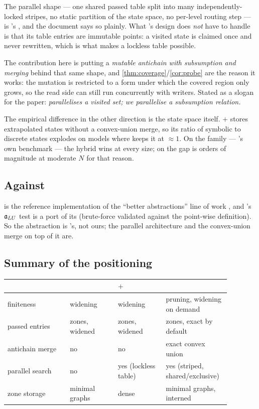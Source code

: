 The parallel shape --- one shared passed table split into many
independently-locked stripes, no static partition of the state space, no
per-level routing step --- is \ltsmin{}'s
\cite{LTSmin,OpaalLTSmin}, and the document says so plainly.  What
\ltsmin{}'s design does \emph{not} have to handle is that its table entries are
immutable points: a visited state is claimed once and never rewritten, which is
what makes a lockless table possible.

The contribution here is putting a \emph{mutable antichain with subsumption and
merging} behind that same shape, and \cref{thm:coverage}/\cref{cor:probe} are
the reason it works: the mutation is restricted to a form under which the
covered region only grows, so the read side can still run concurrently with
writers.  Stated as a slogan for the paper: \emph{\ltsmin{} parallelises a
visited set; we parallelise a subsumption relation.}

The empirical difference in the other direction is the state space itself.
\opaal{}$+$\ltsmin{} stores extrapolated states without a convex-union merge, so
its ratio of symbolic to discrete states explodes on models where \tool{} keeps
it at $\approx 1$.  On the  family --- \ltsmin{}'s own benchmark ---
the \tool{} hybrid wins at every size; on  the gap is orders of
magnitude at moderate $N$ for that reason.

\subsection{Against \tchecker{}}

\tchecker{} is the reference implementation of the ``better abstractions'' line
of work \cite{HSW12}, and \tool{}'s $\mathfrak{a}_{LU}$ test is a port of its
 (brute-force validated against the point-wise definition).  So
the abstraction is \tchecker{}'s, not ours; the parallel architecture and the
convex-union merge on top of it are.

\subsection{Summary of the positioning}

\begin{center}
\begin{tabular}{@{}p{0.26\linewidth}p{0.2\linewidth}p{0.2\linewidth}p{0.22\linewidth}@{}}
\toprule
 & \uppaal{} & \opaal{}$+$\ltsmin{} & \tool{} \\
\midrule
finiteness      & widening & widening & pruning, widening on demand \\
passed entries  & zones, widened & zones, widened & zones, exact by default \\
antichain merge & no & no & exact convex union \\
parallel search & no & yes (lockless table) & yes (striped, shared/exclusive) \\
zone storage    & minimal graphs & dense & minimal graphs, interned \\
\bottomrule
\end{tabular}
\end{center}
